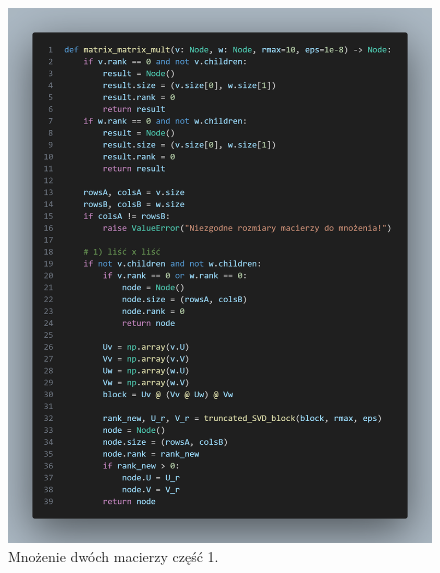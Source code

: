 \documentclass[11pt, leqno]{scrartcl}
\begin{document}
    \begin{figure}[H]
        \centering
        \includegraphics[width=1\linewidth]{matrix_matrix1.png}
        \caption{Mnożenie dwóch macierzy część 1.}
    \end{figure}
\end{document}
